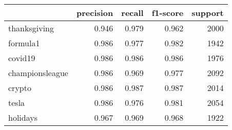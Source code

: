\begin{tabular}{lrrrr}
\toprule
{} &  precision &  recall &  f1-score &  support \\
\midrule
thanksgiving    &      0.946 &   0.979 &     0.962 &     2000 \\
formula1        &      0.986 &   0.977 &     0.982 &     1942 \\
covid19         &      0.986 &   0.986 &     0.986 &     1976 \\
championsleague &      0.986 &   0.969 &     0.977 &     2092 \\
crypto          &      0.986 &   0.987 &     0.987 &     2014 \\
tesla           &      0.986 &   0.976 &     0.981 &     2054 \\
holidays        &      0.967 &   0.969 &     0.968 &     1922 \\
\bottomrule
\end{tabular}
